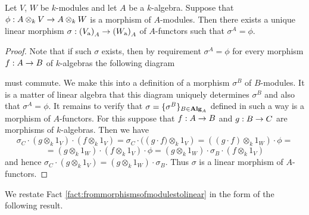 \begin{fact}\label{fact:frommorphismsofmodulestolinear}
Let $V$, $W$ be $k$-modules and let $A$ be a $k$-algebra. Suppose that  $\phi:A\otimes_kV\rightarrow A\otimes_kW$ is a morphism of $A$-modules. Then there exists a unique linear morphism $\sigma:\left(V_{\mathrm{a}}\right)_A\rightarrow \left(W_{\mathrm{a}}\right)_A$ of $A$-functors such that $\sigma^A = \phi$.
\end{fact}
\begin{proof}
Note that if such $\sigma$ exists, then by requirement $\sigma^A = \phi$ for every morphism $f:A\rightarrow B$ of $k$-algebras the following diagram
\begin{center}
\end{center}
must commute. We make this into a definition of a morphism $\sigma^B$ of $B$-modules. It is a matter of linear algebra that this diagram uniquely determines $\sigma^B$ and also that $\sigma^A = \phi$. It remains to verify that $\sigma = \{\sigma^B\}_{B\in \mathbf{Alg}_A}$ defined in such a way is a morphism of $A$-functors. For this suppose that $f:A\rightarrow B$ and $g:B\rightarrow C$ are morphisms of $k$-algebras. Then we have
$$\sigma_C \cdot (g \otimes_k 1_V) \cdot (f\otimes_k 1_V) = \sigma_C \cdot (\left (g\cdot f) \otimes_k 1_V\right) = \left((g\cdot f) \otimes_k 1_W \right) \cdot \phi = $$
$$ = (g \otimes_k 1_W) \cdot (f \otimes_k 1_V)\cdot \phi= (g \otimes_k 1_W)\cdot \sigma_B \cdot (f \otimes_k 1_V)$$
and hence $\sigma_C \cdot (g \otimes_k 1_V) = (g \otimes_k 1_W) \cdot \sigma_B$. Thus $\sigma$ is a linear morphism of $A$-functors.
\end{proof}
\noindent
We restate Fact \ref{fact:frommorphismsofmodulestolinear} in the form of the following result.

